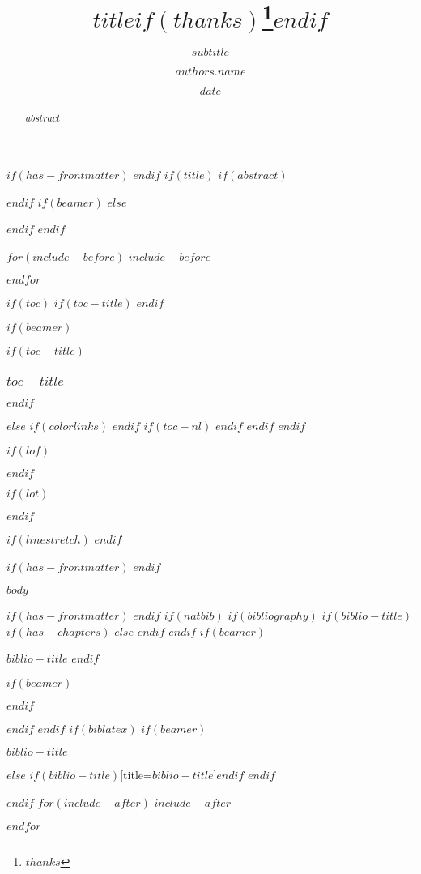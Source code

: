 \documentclass[
$if(fontsize)$
$fontsize$,
$endif$
$if(papersize)$
$papersize$paper,
$endif$
$if(beamer)$
ignorenonframetext,
$if(handout)$
handout,
$endif$
$if(aspectratio)$
aspectratio=$aspectratio$,
$endif$
$endif$
$for(classoption)$
$classoption$$sep$,
$endfor$
]{$documentclass$}
\title{$title$$if(thanks)$\thanks{$thanks$}$endif$}
\subtitle{$subtitle$}
\author{$authors.name$}
\affiliation{%
  \institution{$authors.affiliation.institution$}
  \country{$authors.affiliation.country$}
}
\date{$date$}
\institute{$for(institute)$$institute$$sep$ \and $endfor$}
\newif\ifbibliography
\begin{document}
$if(has-frontmatter)$
\frontmatter
$endif$
$if(title)$
$if(abstract)$
\begin{abstract}
$abstract$
\end{abstract}
$endif$
$if(beamer)$
\frame{\titlepage}
$else$
\maketitle
$endif$
$endif$

$for(include-before)$
$include-before$

$endfor$

$if(toc)$
$if(toc-title)$
\renewcommand*\contentsname{$toc-title$}
$endif$

$if(beamer)$
\begin{frame}[allowframebreaks]
$if(toc-title)$
\frametitle{$toc-title$}
$endif$
\tableofcontents[hideallsubsections]
\end{frame}
$else$
{
$if(colorlinks)$
\hypersetup{linkcolor=$if(toccolor)$$toccolor$$else$$endif$}
$endif$
\setcounter{tocdepth}{$toc-depth$}
\tableofcontents
$if(toc-nl)$
\pagebreak
$endif$
}
$endif$
$endif$

$if(lof)$
\listoffigures
$endif$

$if(lot)$
\listoftables
$endif$

$if(linestretch)$
$endif$

$if(has-frontmatter)$
\mainmatter
$endif$

$body$

$if(has-frontmatter)$
\backmatter
$endif$
$if(natbib)$
$if(bibliography)$
$if(biblio-title)$
$if(has-chapters)$
\renewcommand\bibname{$biblio-title$}
$else$
\renewcommand\refname{$biblio-title$}
$endif$
$endif$
$if(beamer)$
\begin{frame}[allowframebreaks]{$biblio-title$}
\bibliographytrue
$endif$

$if(beamer)$
\end{frame}
$endif$

$endif$
$endif$
$if(biblatex)$
$if(beamer)$
\begin{frame}[allowframebreaks]{$biblio-title$}
\bibliographytrue
\printbibliography[heading=none]
\end{frame}
$else$
\printbibliography$if(biblio-title)$[title=$biblio-title$]$endif$
$endif$

$endif$
$for(include-after)$
$include-after$

$endfor$
\end{document}
